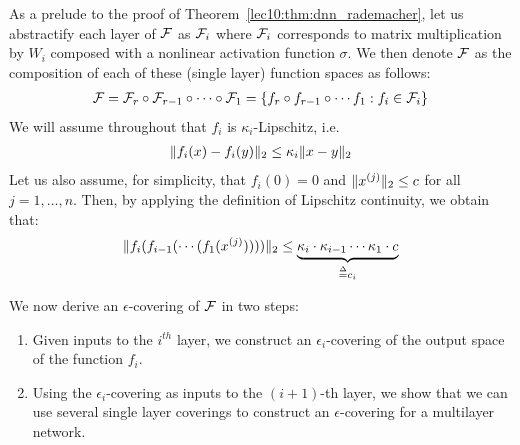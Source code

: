 As a prelude to the proof of Theorem~\ref{lec10:thm:dnn_rademacher}, let us abstractify each layer of $\mathcal F$ as $\mathcal F_i$ where $\mathcal F_i$ corresponds to matrix multiplication by $W_i$ composed with a nonlinear activation function $\sigma$. We then denote $\mathcal F$ as the composition of each of these (single layer) function spaces as follows:
\begin{align}
    \mathcal F = \mathcal F_r \circ \mathcal F_{r - 1} \circ \cdots \circ \mathcal F_1 = \{f_r \circ f_{r - 1} \circ \cdots f_{1} : f_i \in \mathcal F_i\}
\end{align}
We will assume throughout that $f_i$ is $\kappa_i$-Lipschitz, i.e.
\begin{align}
    \|f_i(x) - f_i(y)\|_2 \leq \kappa_i \|x - y\|_2 \label{lec10:eqn:lipschitz-def}
\end{align} 
Let us also assume, for simplicity, that $f_i(0) = 0$ and $\|x^{(j)}\|_2 \leq c$ for all $j = 1,\dots,n$. Then, by applying the definition of Lipschitz continuity, we obtain that:
\begin{align}
    \norm{f_i(f_{i - 1}(\cdots(f_1(x\sp{j}))))}_2 \leq \underbrace{\kappa_{i} \cdot \kappa_{i - 1} \cdots \kappa_1 \cdot c}_{\defeq c_i}
\end{align}

We now derive an $\epsilon$-covering of $\mathcal F$ in two steps:
\begin{enumerate}
    \item Given inputs to the $i^{th}$ layer, we construct an $\epsilon_i$-covering of the output space of the function $f_i$.
    \item Using the $\epsilon_i$-covering as inputs to the $(i + 1)$-th layer, we show that we can use several single layer coverings to construct an $\epsilon$-covering for a multilayer network.
\end{enumerate}

